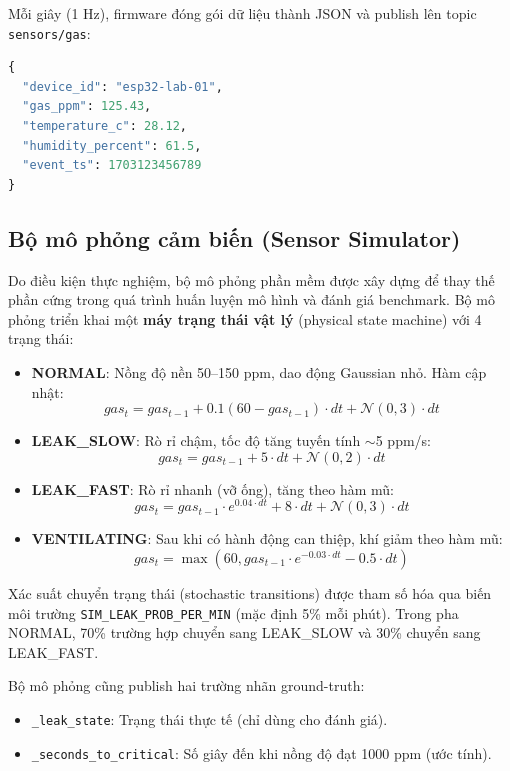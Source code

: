 Mỗi giây (1 Hz), firmware đóng gói dữ liệu thành JSON và publish lên topic \texttt{sensors/gas}:

\begin{lstlisting}[language=Python, caption={Cấu trúc payload JSON từ thiết bị}]
{
  "device_id": "esp32-lab-01",
  "gas_ppm": 125.43,
  "temperature_c": 28.12,
  "humidity_percent": 61.5,
  "event_ts": 1703123456789
}
\end{lstlisting}

\subsection{Bộ mô phỏng cảm biến (Sensor Simulator)}

Do điều kiện thực nghiệm, bộ mô phỏng phần mềm được xây dựng để thay thế phần cứng trong quá trình huấn luyện mô hình và đánh giá benchmark. Bộ mô phỏng triển khai một \textbf{máy trạng thái vật lý} (physical state machine) với 4 trạng thái:

\begin{itemize}
  \item \textbf{NORMAL}: Nồng độ nền 50–150 ppm, dao động Gaussian nhỏ. Hàm cập nhật:
  \[gas_t = gas_{t-1} + 0.1(60 - gas_{t-1}) \cdot dt + \mathcal{N}(0, 3) \cdot dt\]

  \item \textbf{LEAK\_SLOW}: Rò rỉ chậm, tốc độ tăng tuyến tính $\sim$5 ppm/s:
  \[gas_t = gas_{t-1} + 5 \cdot dt + \mathcal{N}(0, 2) \cdot dt\]

  \item \textbf{LEAK\_FAST}: Rò rỉ nhanh (vỡ ống), tăng theo hàm mũ:
  \[gas_t = gas_{t-1} \cdot e^{0.04 \cdot dt} + 8 \cdot dt + \mathcal{N}(0, 3) \cdot dt\]

  \item \textbf{VENTILATING}: Sau khi có hành động can thiệp, khí giảm theo hàm mũ:
  \[gas_t = \max(60, gas_{t-1} \cdot e^{-0.03 \cdot dt} - 0.5 \cdot dt)\]
\end{itemize}

Xác suất chuyển trạng thái (stochastic transitions) được tham số hóa qua biến môi trường \texttt{SIM\_LEAK\_PROB\_PER\_MIN} (mặc định 5\% mỗi phút). Trong pha NORMAL, 70\% trường hợp chuyển sang LEAK\_SLOW và 30\% chuyển sang LEAK\_FAST.

Bộ mô phỏng cũng publish hai trường nhãn ground-truth:
\begin{itemize}
  \item \texttt{\_leak\_state}: Trạng thái thực tế (chỉ dùng cho đánh giá).
  \item \texttt{\_seconds\_to\_critical}: Số giây đến khi nồng độ đạt 1000 ppm (ước tính).
\end{itemize}

